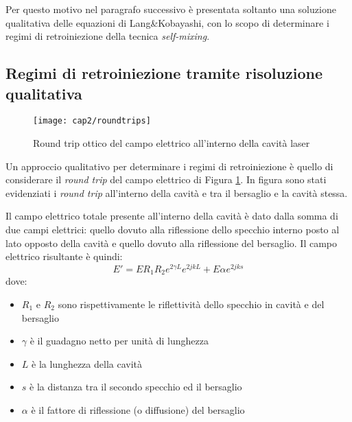 Per questo motivo nel paragrafo successivo è presentata soltanto una soluzione qualitativa delle equazioni di Lang\&Kobayashi, con lo scopo di determinare i regimi di retroiniezione della tecnica \textit{self-mixing}.

\subsection{Regimi di retroiniezione tramite risoluzione qualitativa}
\begin{figure}  
  \begin{center}
    \texttt{[image: cap2/roundtrips]}
    \caption{Round trip ottico del campo elettrico all'interno della cavità laser}
    \label{roundtrips}
  \end{center}
\end{figure}
Un approccio qualitativo per determinare i regimi di retroiniezione è quello di considerare il \textit{round trip} del campo elettrico di Figura \ref{roundtrips}. In figura sono stati evidenziati i \textit{round trip} all'interno della cavità e tra il bersaglio e la cavità stessa.

Il campo elettrico totale presente all'interno della cavità è dato dalla somma di due campi elettrici: quello dovuto alla riflessione dello specchio interno posto al lato opposto della cavità e quello dovuto alla riflessione del bersaglio. Il campo elettrico risultante è quindi:
\begin{equation}
	E'=ER_1R_2e^{2\gamma L}e^{2jkL}+E\alpha e^{2jks}
\end{equation}
dove:
\begin{itemize}
	\item $R_1$ e $R_2$ sono rispettivamente le riflettività dello specchio in cavità e del bersaglio
	\item $\gamma$ è il guadagno netto per unità di lunghezza
	\item $L$ è la lunghezza della cavità
	\item $s$ è la distanza tra il secondo specchio ed il bersaglio
	\item $\alpha$ è il fattore di riflessione (o diffusione) del bersaglio
\end{itemize}

